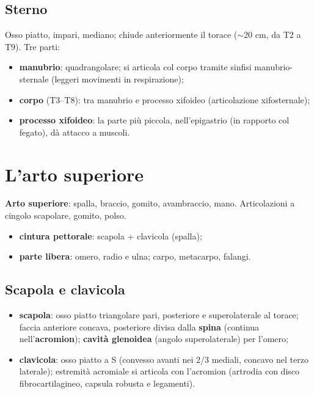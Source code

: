 \subsection{Sterno}
Osso piatto, impari, mediano; chiude anteriormente il torace ($\sim$20 cm, da T2 a T9). Tre parti:
\begin{itemize}
  \item \textbf{manubrio}: quadrangolare; si articola col corpo tramite sinfisi manubrio-sternale
    (leggeri movimenti in respirazione);
  \item \textbf{corpo} (T3--T8): tra manubrio e processo xifoideo (articolazione xifosternale);
  \item \textbf{processo xifoideo}: la parte più piccola, nell'epigastrio (in rapporto col fegato),
    dà attacco a muscoli.
\end{itemize}

\section{L'arto superiore}

\textbf{Arto superiore}: spalla, braccio, gomito, avambraccio, mano. Articolazioni a cingolo
scapolare, gomito, polso.
\begin{itemize}
  \item \textbf{cintura pettorale}: scapola + clavicola (spalla);
  \item \textbf{parte libera}: omero, radio e ulna; carpo, metacarpo, falangi.
\end{itemize}

\subsection{Scapola e clavicola}
\begin{itemize}
  \item \textbf{scapola}: osso piatto triangolare pari, posteriore e superolaterale al torace;
    faccia anteriore concava, posteriore divisa dalla \textbf{spina} (continua nell'\textbf{acromion});
    \textbf{cavità glenoidea} (angolo superolaterale) per l'omero;
  \item \textbf{clavicola}: osso piatto a S (convesso avanti nei 2/3 mediali, concavo nel terzo
    laterale); estremità acromiale si articola con l'acromion (artrodia con disco fibrocartilagineo,
    capsula robusta e legamenti).
\end{itemize}

